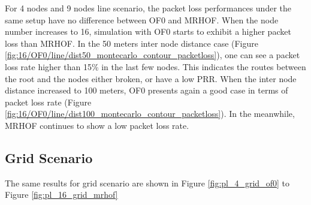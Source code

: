 For 4 nodes and 9 nodes line scenario, the packet loss performances under the same setup have no difference between OF0 and MRHOF. When the node number increases to 16, simulation with OF0 starts to exhibit a higher packet loss than MRHOF. In the 50 meters inter node distance case (Figure \ref{fig:16/OF0/line/dist50_montecarlo_contour_packetloss}), one can see a packet loss rate higher than 15\% in the last few nodes. This indicates the routes between the root and the nodes either broken, or have a low PRR. When the inter node distance increased to 100 meters, OF0 presents again a good case in terms of packet loss rate (Figure \ref{fig:16/OF0/line/dist100_montecarlo_contour_packetloss}). In the meanwhile, MRHOF continues to show a low packet loss rate.   
\newline 

\subsection{Grid Scenario}
\label{grid}
The same results for grid scenario are shown in Figure \ref{fig:pl_4_grid_of0} to Figure \ref{fig:pl_16_grid_mrhof}

